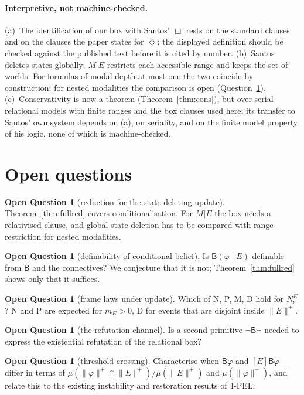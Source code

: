 \documentclass[11pt,a4paper]{article}
\theoremstyle{definition}
\newtheorem{question}[theorem]{Open Question}
\theoremstyle{remark}
\newcommand{\Bel}{\mathsf{B}}
\newcommand{\pos}[1]{\lVert #1\rVert^{+}}
\begin{document}
\paragraph{Interpretive, not machine-checked.}
(a)~The identification of our box with Santos' $\Box$ rests on the standard clauses and
on the clauses the paper states for $\Diamond$; the displayed definition should be checked
against the published text before it is cited by number.
(b)~Santos deletes states globally; $M|E$ restricts each accessible range and keeps the
set of worlds. For formulas of modal depth at most one the two coincide by construction;
for nested modalities the comparison is open (Question~\ref{q:nested}).
(c)~Conservativity is now a theorem (Theorem~\ref{thm:cons}), but over serial relational
models with finite ranges and the box clauses used here; its transfer to Santos' own
system depends on (a), on seriality, and on the finite model property of his logic, none
of which is machine-checked.

\section{Open questions}\label{sec:open}

\begin{question}[reduction for the state-deleting update]\label{q:nested}
Theorem~\ref{thm:fullred} covers conditionalisation. For $M|E$ the box needs a relativised
clause, and global state deletion has to be compared with range restriction for nested
modalities.
\end{question}

\begin{question}[definability of conditional belief]
Is $\Bel(\varphi\mid E)$ definable from $\Bel$ and the connectives? We conjecture that it
is not; Theorem~\ref{thm:fullred} shows only that it suffices.
\end{question}

\begin{question}[frame laws under update]
Which of N, P, M, D hold for $N^{E}_c$? N and P are expected for $m_E>0$, D for events
that are disjoint inside $\pos{E}$.
\end{question}

\begin{question}[the refutation channel]
Is a second primitive $\neg\Bel\neg$ needed to express the existential refutation of the
relational box?
\end{question}

\begin{question}[threshold crossing]
Characterise when $\Bel\varphi$ and $[E]\Bel\varphi$ differ in terms of
$\mu(\pos{\varphi}\cap\pos{E})/\mu(\pos{E})$ and $\mu(\pos{\varphi})$, and relate this to
the existing instability and restoration results of 4-PEL.
\end{question}
\end{document}
